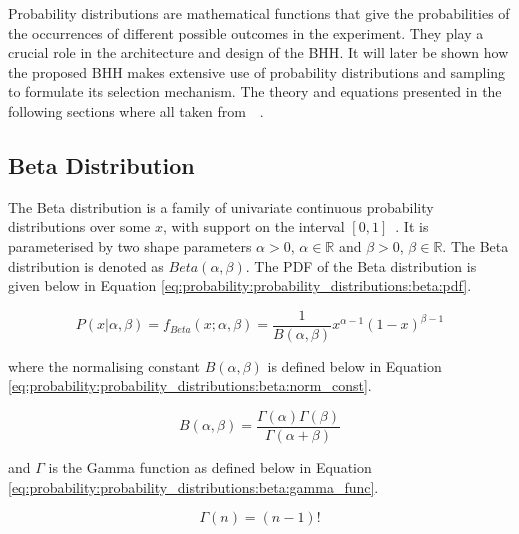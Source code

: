 Probability distributions are mathematical functions that give the probabilities of the occurrences of different possible outcomes in the experiment. They play a crucial role in the architecture and design of the \ac{BHH}. It will later be shown how the proposed \ac{BHH} makes extensive use of probability distributions and sampling to formulate its selection mechanism. The theory and equations presented in the following sections where all taken from~\citeauthor{ref:wackerly:2014}~\cite{ref:wackerly:2014}.


\subsection{Beta Distribution}
\label{sec:probability:probability_distributions:beta}

The Beta distribution is a family of univariate continuous probability distributions over some $x$, with support on the interval $[0,1]$~\cite{ref:wackerly:2014}. It is parameterised by two shape parameters $\alpha > 0$, $\alpha \in \mathbb{R}$ and $\beta > 0$, $\beta \in \mathbb{R}$. The Beta distribution is denoted as $Beta(\alpha, \beta)$. The \ac{PDF} of the Beta distribution is given below in Equation \ref{eq:probability:probability_distributions:beta:pdf}.

\begin{equation}
      \label{eq:probability:probability_distributions:beta:pdf}
      P(x \vert \alpha, \beta) = f_{Beta}(x; \alpha, \beta) = \frac{1}{B(\alpha, \beta)} x^{\alpha - 1} (1 - x)^{\beta - 1}
\end{equation}

where the normalising constant $B(\alpha, \beta)$ is defined below in Equation \ref{eq:probability:probability_distributions:beta:norm_const}.

\begin{equation}
      \label{eq:probability:probability_distributions:beta:norm_const}
      B(\alpha, \beta) = \frac{\Gamma(\alpha)\Gamma(\beta)}{\Gamma(\alpha + \beta)}
\end{equation}

and $\Gamma$ is the Gamma function as defined below in Equation \ref{eq:probability:probability_distributions:beta:gamma_func}.

\begin{equation}
      \label{eq:probability:probability_distributions:beta:gamma_func}
      \Gamma(n) = ( n - 1)!
\end{equation}

